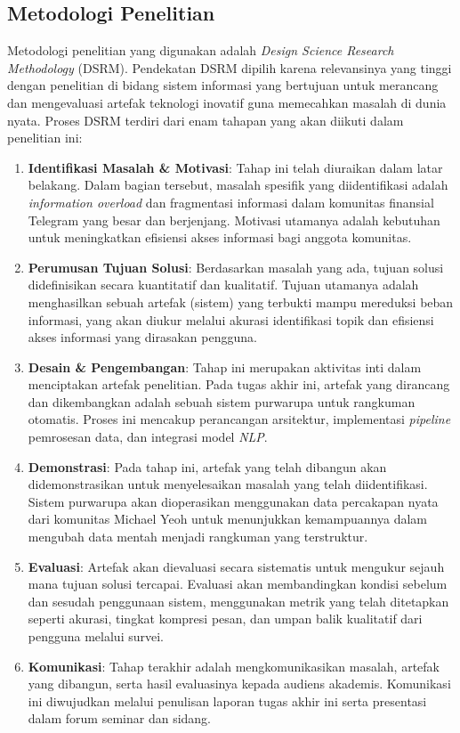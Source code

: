 \subsection{Metodologi Penelitian}
Metodologi penelitian yang digunakan adalah \textit{Design Science Research Methodology} (DSRM). Pendekatan DSRM dipilih karena relevansinya yang tinggi dengan penelitian di bidang sistem informasi yang bertujuan untuk merancang dan mengevaluasi artefak teknologi inovatif guna memecahkan masalah di dunia nyata. Proses DSRM terdiri dari enam tahapan yang akan diikuti dalam penelitian ini:

\begin{enumerate}
\item \textbf{Identifikasi Masalah \& Motivasi}: Tahap ini telah diuraikan dalam latar belakang. Dalam bagian tersebut, masalah spesifik yang diidentifikasi adalah \textit{information overload} dan fragmentasi informasi dalam komunitas finansial Telegram yang besar dan berjenjang. Motivasi utamanya adalah kebutuhan untuk meningkatkan efisiensi akses informasi bagi anggota komunitas.

\item \textbf{Perumusan Tujuan Solusi}: Berdasarkan masalah yang ada, tujuan solusi didefinisikan secara kuantitatif dan kualitatif. Tujuan utamanya adalah menghasilkan sebuah artefak (sistem) yang terbukti mampu mereduksi beban informasi, yang akan diukur melalui akurasi identifikasi topik dan efisiensi akses informasi yang dirasakan pengguna.

\item \textbf{Desain \& Pengembangan}: Tahap ini merupakan aktivitas inti dalam menciptakan artefak penelitian. Pada tugas akhir ini, artefak yang dirancang dan dikembangkan adalah sebuah sistem purwarupa untuk rangkuman otomatis. Proses ini mencakup perancangan arsitektur, implementasi \textit{pipeline} pemrosesan data, dan integrasi model \textit{NLP}.

\item \textbf{Demonstrasi}: Pada tahap ini, artefak yang telah dibangun akan didemonstrasikan untuk menyelesaikan masalah yang telah diidentifikasi. Sistem purwarupa akan dioperasikan menggunakan data percakapan nyata dari komunitas Michael Yeoh untuk menunjukkan kemampuannya dalam mengubah data mentah menjadi rangkuman yang terstruktur.

\item \textbf{Evaluasi}: Artefak akan dievaluasi secara sistematis untuk mengukur sejauh mana tujuan solusi tercapai. Evaluasi akan membandingkan kondisi sebelum dan sesudah penggunaan sistem, menggunakan metrik yang telah ditetapkan seperti akurasi, tingkat kompresi pesan, dan umpan balik kualitatif dari pengguna melalui survei.

\item \textbf{Komunikasi}: Tahap terakhir adalah mengkomunikasikan masalah, artefak yang dibangun, serta hasil evaluasinya kepada audiens akademis. Komunikasi ini diwujudkan melalui penulisan laporan tugas akhir ini serta presentasi dalam forum seminar dan sidang.
\end{enumerate}

